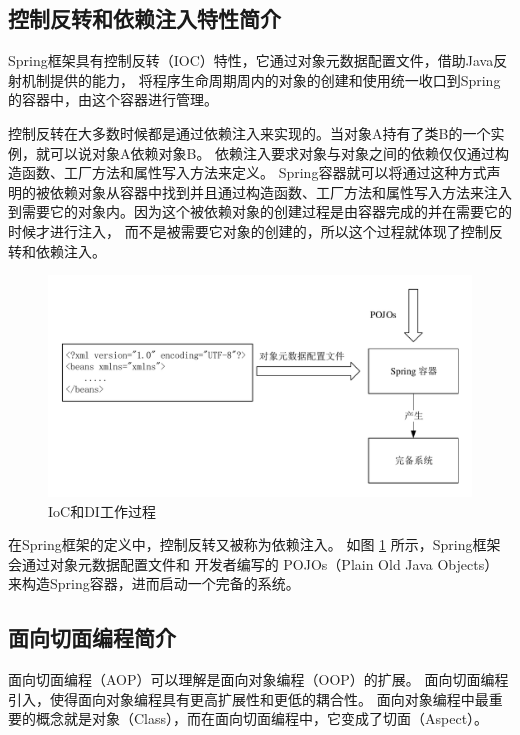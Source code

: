 \subsection{控制反转和依赖注入特性简介}
Spring框架具有控制反转（IOC）特性，它通过对象元数据配置文件，借助Java反射机制提供的能力，
将程序生命周期周内的对象的创建和使用统一收口到Spring的容器中，由这个容器进行管理。

控制反转在大多数时候都是通过依赖注入来实现的。当对象A持有了类B的一个实例，就可以说对象A依赖对象B。
依赖注入要求对象与对象之间的依赖仅仅通过构造函数、工厂方法和属性写入方法来定义。
Spring容器就可以将通过这种方式声明的被依赖对象从容器中找到并且通过构造函数、工厂方法和属性写入方法来注入
到需要它的对象内。因为这个被依赖对象的创建过程是由容器完成的并在需要它的时候才进行注入，
而不是被需要它对象的创建的，所以这个过程就体现了控制反转和依赖注入。

\begin{figure}[ht]
    \centering   
    \includegraphics[scale=.8]{./Figure/IMG_container.pdf}
    \caption{IoC和DI工作过程}\label{Fig:container}
\end{figure}

在Spring框架的定义中，控制反转又被称为依赖注入。
如图 \ref{Fig:container} 所示，Spring框架会通过对象元数据配置文件和
开发者编写的 POJOs（Plain Old Java Objects）来构造Spring容器，进而启动一个完备的系统。

\subsection{面向切面编程简介}
面向切面编程（AOP）可以理解是面向对象编程（OOP）的扩展。
面向切面编程引入，使得面向对象编程具有更高扩展性和更低的耦合性。
面向对象编程中最重要的概念就是对象（Class），而在面向切面编程中，它变成了切面（Aspect）。

